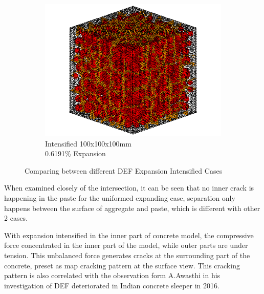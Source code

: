 \begin{figure}[ht!]
\begin{subfigure}{.3\textwidth}
      \includegraphics[width=.9\linewidth]{Files/exp_3D/DEF/A30X-1C_3_c.png}
    \caption{Intensified 100x100x100mm \\  0.6191\% Expansion}
    \end{subfigure}%

  \caption{Comparing between different DEF Expansion Intensified Cases}
  \label{fig:DEF_X_compare}
\end{figure}


When examined closely of the intersection, it can be seen that no inner crack is happening in the paste for the uniformed expanding case, separation only happens between the surface of aggregate and paste, which is different with other 2 cases.

With expansion intensified in the inner part of concrete model, the compressive force concentrated in the inner part of the model, while outer parts are under tension. This unbalanced force generates cracks at the surrounding part of the concrete, preset as map cracking pattern at the surface view. This cracking pattern is also correlated with the observation form A.Awasthi in his investigation of DEF deteriorated in Indian concrete sleeper in 2016\cite{Awasthi}.
